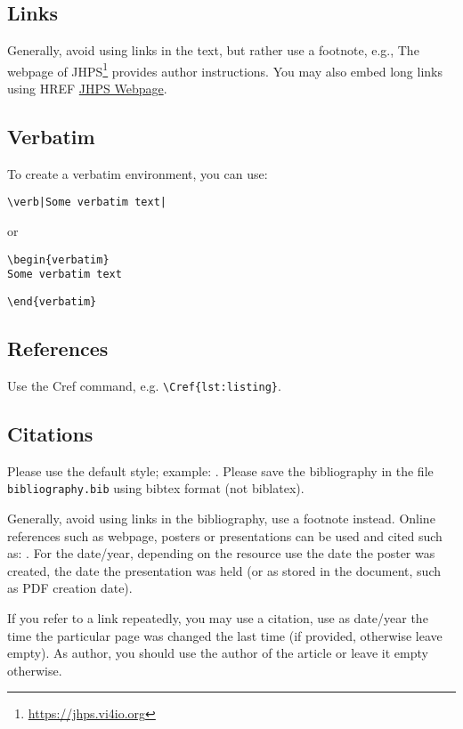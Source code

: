 \documentclass{jhps}
\begin{document}
\subsection{Links}
Generally, avoid using links in the text, but rather use a footnote, e.g.,
The webpage of JHPS\footnote{\url{https://jhps.vi4io.org}} provides author instructions.
You may also embed long links using HREF \href{https://jhps.vi4io.org}{JHPS Webpage}.

\subsection{Verbatim}
To create a verbatim environment, you can use:
\begin{verbatim}
\verb|Some verbatim text|
\end{verbatim}
or
\begin{verbatim}
\begin{verbatim}
Some verbatim text
\end{verbatim}
\vspace*{-0.8em}
\verb|\end{verbatim}|

\subsection{References}

Use the Cref command, e.g. \verb|\Cref{lst:listing}|.\subsection{Citations}

Please use the default style; example: \cite{misc1998}.
Please save the bibliography in the file \texttt{bibliography.bib} using bibtex format (not biblatex).

Generally, avoid using links in the bibliography, use a footnote instead.
Online references such as webpage, posters or presentations can be used and cited such as: \cite{link20pres, link20post, link20web}.
For the date/year, depending on the resource use the date the poster was created, the date the presentation was held (or as stored in the document, such as PDF creation date).

If you refer to a link repeatedly, you may use a citation, use as date/year the time the particular page was changed the last time (if provided, otherwise leave empty).
As author, you should use the author of the article or leave it empty otherwise.
\end{document}
